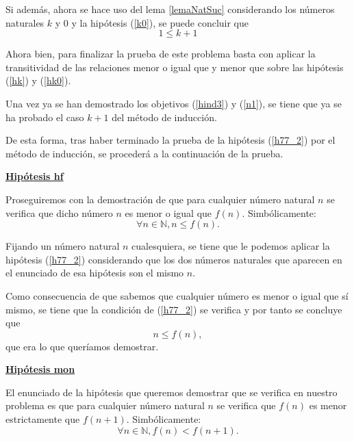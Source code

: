 \begin{demostracion}
\begin{itemize}
\begin{enumerate}
        Si además, ahora se hace uso del lema \ref{lemaNatSuc}
        considerando los números naturales \(k\) y \(0\) y la
        hipótesis (\ref{k0}), se puede concluir que
        \begin{equation}\label{hk0}\tag{hk0}
          1 ≤ k+1
        \end{equation}

        Ahora bien, para finalizar la prueba de este problema basta
        con aplicar la transitividad de las relaciones menor o igual que
        y menor que sobre las hipótesis (\ref{hk}) y (\ref{hk0}).

      \end{enumerate}

    Una vez ya se han demostrado los objetivos (\ref{hind3}) y
    (\ref{n1}), se tiene que ya se ha probado el caso \(k+1\) del
    método de inducción.
    \end{itemize}

  De esta forma, tras haber terminado la prueba de la hipótesis
  (\ref{h77_2}) por el método de inducción, se procederá a la
  continuación de la prueba.

  \noindent
  \textbf{\underline{Hipótesis hf}}

  Proseguiremos con la demostración de que para cualquier número
  natural \(n\) se verifica que dicho número \(n\) es menor o igual
  que \(f(n)\). Simbólicamente:
  \begin{equation}\label{hf}\tag{hf}
    ∀n∈ ℕ, n ≤ f(n).
  \end{equation}

  Fijando un número natural \(n\) cualesquiera, se tiene que le
  podemos aplicar la hipótesis (\ref{h77_2}) considerando que los dos
  números naturales que aparecen en el enunciado de esa hipótesis
  son el mismo \(n\).

  Como consecuencia de que sabemos que cualquier número es menor
  o igual que sí mismo, se tiene que la condición de (\ref{h77_2}) se
  verifica y por tanto se concluye que
  \begin{equation}
    n ≤ f(n),
  \end{equation}
  que era lo que queríamos demostrar.

  \noindent
  \textbf{\underline{Hipótesis mon}}

  El enunciado de la hipótesis que queremos demostrar que se
  verifica en nuestro problema es que para cualquier número natural
  \(n\) se verifica que \(f(n)\) es menor estrictamente que \(f(n+1)\).
  Simbólicamente:
  \begin{equation}\label{mon}\tag{mon}
    ∀n ∈ ℕ, f(n) < f(n+1).
  \end{equation}


\end{demostracion}
